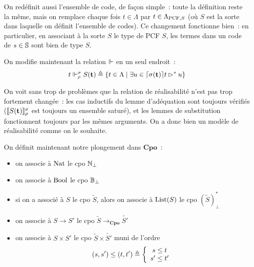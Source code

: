 \documentclass{article}
\begin{document}
On redéfinit aussi l'ensemble de code, de façon simple~: toute la définition reste la même, mais on remplace chaque fois $t\in \Lambda$ par $t\in \Lambda_{\mathrm{PCF}, S}$ (où $S$ est la sorte dans laquelle on définit l'ensemble de codes). Ce changement fonctionne bien~: en particulier, en associant à la sorte $S$ le type de PCF $S$, les termes dans un code de $s\in \mathbb{S}$ sont bien de type $S$.

On modifie maintenant la relation $\Vdash$ en un seul endroit~:
\[t\Vdash_\rho^\sigma S(\mathbf{t}) \triangleq \{ t \in \Lambda\mid \exists u \in \lceil \sigma(\mathbf{t}) \rceil t\rhd^* u\}\]

On voit sans trop de problèmes que la relation de réalisabilité n'est pas trop fortement changée~: les cas inductifs du lemme d'adéquation sont toujours vérifiés ($\llbracket S(\mathbf{t}) \rrbracket_\rho^\sigma$ est toujours un ensemble saturé), et les lemmes de substitution fonctionnent toujours par les mêmes arguments. On a donc bien un modèle de réalisabilité comme on le souhaite.

On définit maintenant notre plongement dans $\mathbf{Cpo}$~:
\begin{itemize}
    \item on associe à $\mathrm{Nat}$ le cpo $\mathbb{N}_\bot$
    \item on associe à $\mathrm{Bool}$ le cpo $\mathbb{B}_\bot$
    \item si on a associé à $S$ le cpo $\tilde S$, alors on associe à $\mathrm{List}(S)$ le cpo $(\tilde S)^*_\bot$
    \item on associe à $S \to S'$ le cpo $\tilde S \to_{\mathbf{Cpo}} \tilde{S'}$
    \item on associe à $S \times S'$ le cpo $\tilde S \times \tilde{S'}$ muni de l'ordre
    \[(s,s') \leq (t,t') \triangleq \left\{\begin{array}{c}
        s \leq t \\
        s' \leq t'
    \end{array}\right.\]
\end{itemize}
\end{document}

